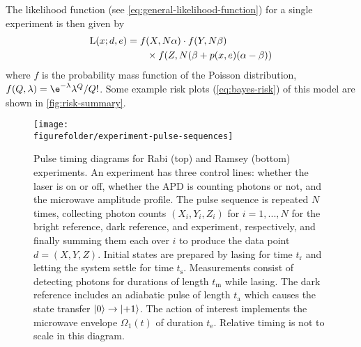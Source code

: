 \documentclass[aps,nofootinbib,twocolumn,superscriptaddress]{revtex4}
\newcommand{\figurefolder}{../fig}
\newcommand{\mps}{x}
\newcommand{\eps}{e}
\newcommand{\data}{d}
\newcommand{\te}{t_\text{e}}
\newcommand{\tm}{t_\text{m}}
\begin{document}
The likelihood function (see \autoref{eq:general-likelihood-function})
for a single experiment is then given by
\begin{align}
    \Lhood(\mps;\data,\eps)
        &= f(X,N\alpha)
            \cdot f(Y, N\beta) \nonumber \\
            &\quad\quad\times f(Z, N(\beta+p(\mps,\eps)(\alpha-\beta))
    \label{eq:likelihood-function}
\end{align}
where $f$ is the probability mass function of the Poisson distribution,
$f(Q,\lambda) = \e^{-\lambda}\lambda^Q/Q!$.
Some example risk plots (\autoref{eq:bayes-risk}) of this model
are shown in \autoref{fig:risk-summary}.


\begin{figure}[t]
    \texttt{[image: \\figurefolder/experiment-pulse-sequences]}
    \caption{Pulse timing diagrams for Rabi (top) and Ramsey
        (bottom) experiments. An experiment has three control lines:
        whether the laser is on or off, whether the APD is counting
        photons or not, and the microwave amplitude profile.
        The pulse sequence is repeated $N$ times, collecting
        photon counts $(X_i,Y_i,Z_i)$ for $i=1,...,N$ for the bright reference,
        dark reference, and experiment, respectively, and finally summing them
        each over $i$ to produce the data point $\data=(X,Y,Z)$.
        Initial states are prepared by lasing for time $t_\text{r}$
        and letting the system settle for time $t_\text{s}$.
        Measurements consist of detecting photons for
        durations of length $\tm$ while lasing.
        The dark reference includes an adiabatic pulse of length
        $t_\text{a}$ which causes the state
        transfer $\ket{0}\rightarrow\ket{+1}$.
        The action of interest implements the microwave envelope
        $\Omega_1(t)$ of duration $\te$.
        Relative timing is not to scale in this diagram.
        }
    \label{fig:experiment-pulse-sequences}
\end{figure}
\end{document}
